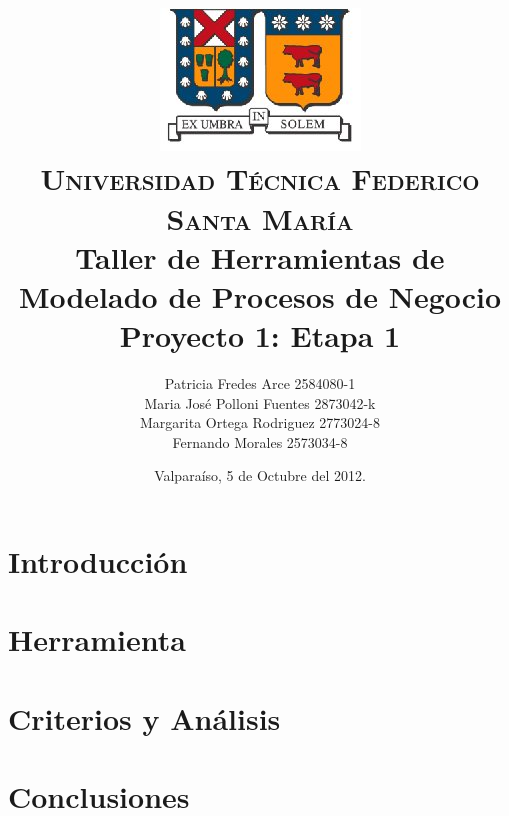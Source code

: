\documentclass[letterpaper,12pt,spanish]{article}
\author{
{\normalsize Patricia Fredes Arce 2584080-1}\\
{\normalsize Maria José Polloni Fuentes 2873042-k}\\
{\normalsize Margarita Ortega Rodriguez 2773024-8}\\
{\normalsize Fernando Morales 2573034-8}\\
}
\title{\vspace{-1cm}\includegraphics[scale=0.5]{imagenes/logo_usm.JPG}\\\vspace{-0.2cm}
    {\small \scshape Universidad T\'ecnica Federico Santa Mar\'ia}\\
    \vspace{1cm}
    {\bfseries Taller de Herramientas de Modelado de Procesos de Negocio} \\ {\Large Proyecto 1: Etapa 1} \\\vspace{0.2cm}{\normalsize Viktor Tapia}
}
\date{Valpara\'iso, 5 de Octubre del 2012.}
\begin{document}
\maketitle
\thispagestyle{empty}
\newpage
\tableofcontents
\newpage

\section{Introducción}


\section{Herramienta}


\section{Criterios y Análisis}


\section{Conclusiones}




 
\end{document}
